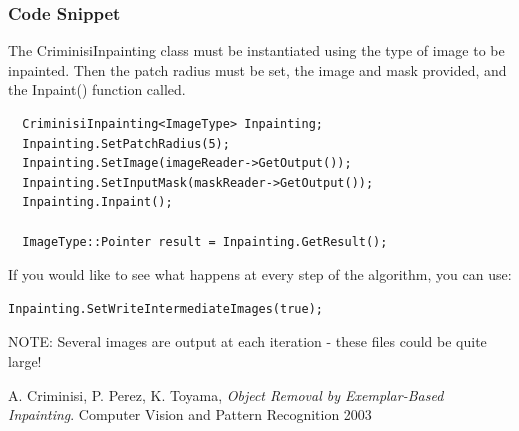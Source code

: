 \documentclass{InsightArticle}
\begin{document}
\subsubsection{Code Snippet}
The CriminisiInpainting class must be instantiated using the type of image to be inpainted. Then the patch radius must be set, the image and mask provided, and the Inpaint() function called.
\begin{verbatim}
  CriminisiInpainting<ImageType> Inpainting;
  Inpainting.SetPatchRadius(5);
  Inpainting.SetImage(imageReader->GetOutput());
  Inpainting.SetInputMask(maskReader->GetOutput());
  Inpainting.Inpaint();

  ImageType::Pointer result = Inpainting.GetResult();

\end{verbatim}

If you would like to see what happens at every step of the algorithm, you can use:
\begin{verbatim}
Inpainting.SetWriteIntermediateImages(true); 
\end{verbatim}
NOTE: Several images are output at each iteration - these files could be quite large!


\begin{thebibliography}{9}

	  A. Criminisi, P. Perez, K. Toyama,
	  \emph{Object Removal by Exemplar-Based Inpainting}.
	  Computer Vision and Pattern Recognition 2003

\end{thebibliography}
\end{document}
